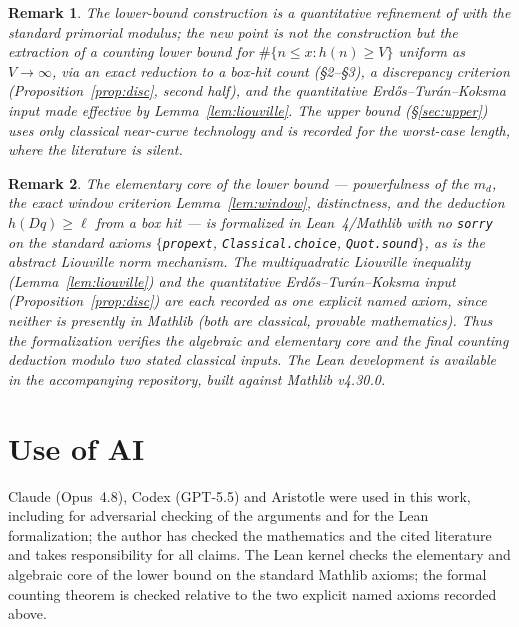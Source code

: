 \documentclass[11pt]{article}
\newtheorem{remark}{Remark}
\theoremstyle{definition}
\begin{document}
\begin{remark}
The lower-bound construction is a quantitative refinement of \cite{DeLu04,DLS} with the standard primorial
modulus; the new point is not the construction but the extraction of a counting lower bound for $\#\{n\le
x:h(n)\ge V\}$ uniform as $V\to\infty$, via an exact reduction to a box-hit count (\S2--\S3), a discrepancy
criterion (Proposition~\ref{prop:disc}, second half), and the quantitative Erd\H{o}s--Tur\'an--Koksma input
made effective by Lemma~\ref{lem:liouville}. The upper bound (\S\ref{sec:upper}) uses only classical
near-curve technology and is recorded for the worst-case length, where the literature is silent.
\end{remark}

\begin{remark}
The elementary core of the lower bound --- powerfulness of the $m_d$, the exact window criterion
Lemma~\ref{lem:window}, distinctness, and the deduction $h(Dq)\ge\ell$ from a box hit --- is formalized in
Lean~4/Mathlib with no \texttt{sorry} on the standard axioms $\{$\texttt{propext}, \texttt{Classical.choice},
\texttt{Quot.sound}$\}$, as is the abstract Liouville norm mechanism. The multiquadratic Liouville inequality
(Lemma~\ref{lem:liouville}) and the quantitative Erd\H{o}s--Tur\'an--Koksma input (Proposition~\ref{prop:disc})
are each recorded as one explicit named axiom, since neither is presently in Mathlib (both are classical,
provable mathematics). Thus the formalization verifies the algebraic and elementary core and the final counting
deduction \emph{modulo} two stated classical inputs. The Lean development is available in the accompanying
repository, built against Mathlib v4.30.0.
\end{remark}

\section*{Use of AI}
Claude (Opus~4.8), Codex (GPT-5.5) and Aristotle were used in this work, including for adversarial checking of
the arguments and for the Lean formalization; the author has checked the mathematics and the cited literature
and takes responsibility for all claims. The Lean kernel checks the elementary and algebraic core of the lower
bound on the standard Mathlib axioms; the formal counting theorem is checked relative to the two explicit named
axioms recorded above.
\end{document}
